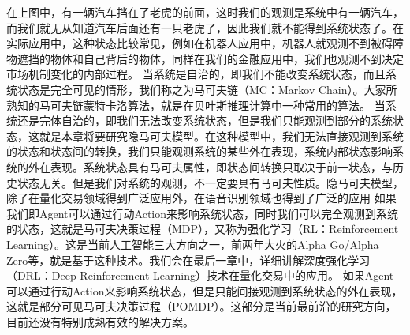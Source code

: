 在上图中，有一辆汽车挡在了老虎的前面，这时我们的观测是系统中有一辆汽车，而我们就无从知道汽车后面还有一只老虎了，因此我们就不能得到系统状态了。在实际应用中，这种状态比较常见，例如在机器人应用中，机器人就观测不到被碍障物遮挡的物体和自己背后的物体，同样在我们的金融应用中，我们也观测不到决定市场机制变化的内部过程。\newline
当系统是自治的，即我们不能改变系统状态，而且系统状态是完全可见的情形，我们称之为马可夫链（MC：Markov Chain）。大家所熟知的马可夫链蒙特卡洛算法，就是在贝叶斯推理计算中一种常用的算法。\newline
当系统还是完体自治的，即我们无法改变系统状态，但是我们只能观测到部分的系统状态，这就是本章将要研究隐马可夫模型。在这种模型中，我们无法直接观测到系统的状态和状态间的转换，我们只能观测系统的某些外在表现，系统内部状态影响系统的外在表现。系统状态具有马可夫属性，即状态间转换只取决于前一状态，与历史状态无关。但是我们对系统的观测，不一定要具有马可夫性质。隐马可夫模型，除了在量化交易领域得到广泛应用外，在语音识别领域也得到了广泛的应用\newline
如果我们即Agent可以通过行动Action来影响系统状态，同时我们可以完全观测到系统的状态，这就是马可夫决策过程（MDP），又称为强化学习（RL：Reinforcement Learning）。这是当前人工智能三大方向之一，前两年大火的Alpha Go/Alpha Zero等，就是基于这种技术。我们会在最后一章中，详细讲解深度强化学习（DRL：Deep Reinforcement Learning）技术在量化交易中的应用。\newline
如果Agent可以通过行动Action来影响系统状态，但是只能间接观测到系统状态的外在表现，这就是部分可见马可夫决策过程（POMDP）。这部分是当前最前沿的研究方向，目前还没有特别成熟有效的解决方案。
